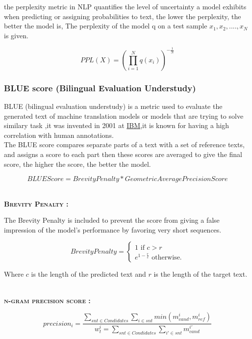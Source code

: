 \documentclass[a4paper,10pt]{article}
\begin{document}
\noindent  the perplexity metric in NLP quantifies the level of uncertainty a model exhibits when predicting or assigning probabilities to text, the lower the perplexity, the better the model is, The perplexity of the model q on a test sample $x_{1},x_{2},....,x_{N}$ is given.

$$
PPL(X) = (\prod\limits_{i=1}^{N} q(x_{i}))^{-\frac{1}{N}}
$$

\subsubsection{BLUE score (Bilingual Evaluation Understudy)}

\noindent BLUE (bilingual evaluation understudy) is a metric used to evaluate the generated text of machine translation models or models that are trying to solve similary task ,it was invented in 2001 at \textcolor{blue}{\href{https://en.wikipedia.org/wiki/IBM}{IBM}},it is known for having a high correlation with human annotations.\\

\noindent The BLUE score compares separate parts of a text with a set of
reference texts, and assigns a score to each part then these scores are averaged to give the final score, the higher the score, the better the model.

$$
BLUE Score = Brevity Penalty * Geometric Average Precision Score
$$

\noindent\textbf{\scshape{\\ Brevity Penalty : \\}}

\noindent The Brevity Penalty is included to prevent the score from giving a false impression of the model's performance by favoring very short sequences.

$$
Brevity Penalty = \begin{cases}
    1 \text{ if $c > r$}\\
    e^{1 - \frac{r}{c}} \text{ otherwise.}
\end{cases}
$$

\noindent Where $c$ is the length of the predicted text and $r$ is the length of the target text.

\newpage
\noindent\textbf{\scshape{\\ n-gram precision score : \\}}

$$
precision_{i} = \frac{\sum\limits_{snt \in Condidates} \sum\limits_{i \in snt} min(m_{cand}^{i}, m_{ref}^{i})}{w_{t}^{i} = \sum\limits_{snt \in Condidates} \sum\limits_{i' \in snt} m_{cand}^{i'}}
$$
\end{document}
